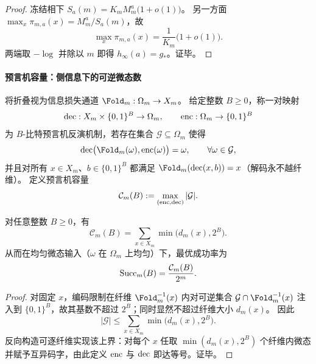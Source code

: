 \begin{proof}
冻结相下 \(S_a(m)=K_mM_m^a\bigl(1+o(1)\bigr)\)。
另一方面 \(\max_x\pi_{m,a}(x)=M_m^a/S_a(m)\)，故
\[
\max_x\pi_{m,a}(x)=\frac{1}{K_m}\bigl(1+o(1)\bigr).
\]
两端取 \(-\log\) 并除以 \(m\) 即得 \(h_\infty(a)=g_*\)。证毕。
\end{proof}

\paragraph{预言机容量：侧信息下的可逆微态数}
将折叠视为信息损失通道 \(\Fold_m:\Omega_m\to X_m\)。
给定整数 \(B\ge 0\)，称一对映射
\[
{\rm dec}:X_m\times\{0,1\}^B\to\Omega_m,\qquad
{\rm enc}:\Omega_m\to\{0,1\}^B
\]
为 \(B\)-比特预言机反演机制，若存在集合 \(\mathcal{G}\subseteq\Omega_m\) 使得
\[
{\rm dec}\bigl(\Fold_m(\omega),{\rm enc}(\omega)\bigr)=\omega,\qquad \forall \omega\in\mathcal{G},
\]
并且对所有 \(x\in X_m\)、\(b\in\{0,1\}^B\) 都满足 \(\Fold_m({\rm dec}(x,b))=x\)（解码永不越纤维）。
定义预言机容量
\[
\mathcal{C}_m(B):=\max_{({\rm enc},{\rm dec})}|\mathcal{G}|.
\]

\begin{theorem}[预言机容量的闭式表达]\label{thm:fold-oracle-capacity-closed-form}
对任意整数 \(B\ge 0\)，有
\[
\mathcal{C}_m(B)=\sum_{x\in X_m}\min\bigl(d_m(x),2^B\bigr).
\]
从而在均匀微态输入（\(\omega\) 在 \(\Omega_m\) 上均匀）下，最优成功率为
\[
{\rm Succ}_m(B)=\frac{\mathcal{C}_m(B)}{2^m}.
\]
\end{theorem}

\begin{proof}
对固定 \(x\)，编码限制在纤维 \(\Fold_m^{-1}(x)\) 内对可逆集合 \(\mathcal{G}\cap \Fold_m^{-1}(x)\) 注入到 \(\{0,1\}^B\)，故其基数不超过 \(2^B\)；同时显然不超过纤维大小 \(d_m(x)\)。
因此
\[
|\mathcal{G}|\le \sum_{x\in X_m}\min\bigl(d_m(x),2^B\bigr).
\]
反向构造可逐纤维实现该上界：对每个 \(x\) 任取 \(\min(d_m(x),2^B)\) 个纤维内微态并赋予互异码字，由此定义 \({\rm enc}\) 与 \({\rm dec}\) 即达等号。证毕。
\end{proof}

